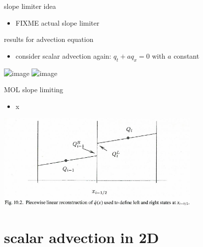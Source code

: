 \documentclass[10pt,hyperref]{beamer}
\begin{document}
\begin{frame}{slope limiter idea}

\begin{itemize}
\item FIXME  actual slope limiter
\end{itemize}
\end{frame}


\begin{frame}{results for advection equation}

\begin{itemize}
\item consider scalar advection again: $q_t + a q_x=0$ with $a$ constant
\end{itemize}

\includegraphics<1>[width=0.7\textwidth]{figs/leveque6p1} \includegraphics<2>[width=0.7\textwidth]{figs/leveque6p2}
\end{frame}


\begin{frame}{MOL slope limiting}

\begin{itemize}
\item x
\end{itemize}

\hfill \includegraphics[width=0.75\textwidth]{figs/leveque10p2}
\end{frame}


\section{scalar advection in 2D}
\end{document}
